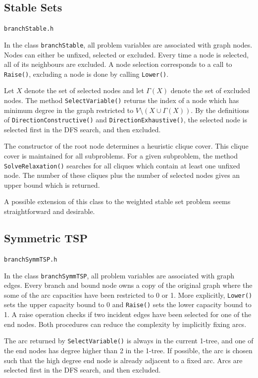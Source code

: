\documentclass[a4paper,11pt,twoside]{book}
\begin{document}
\begin{multicols}{2}
\subsection{Stable Sets}
\label{slb_bbstable}
\myinclude\verb/branchStable.h/

\noindent
In the class \verb/branchStable/, all problem variables are associated with
graph nodes. Nodes can either be unfixed, selected or excluded. Every time
a node is selected, all of its neighbours are excluded. A node selection
corresponds to a call to \verb/Raise()/, excluding a node is done by calling
\verb/Lower()/.

Let $X$ denote the set of selected nodes and let $\Gamma(X)$ denote the set of
excluded nodes. The method \verb/SelectVariable()/ returns the index of a node
which has minimum degree in the graph restricted to
$V\setminus(X\cup\Gamma(X))$. By the definitions of
\verb/DirectionConstructive()/ and \verb/DirectionExhaustive()/, the selected
node is selected first in the DFS search, and then excluded.

The constructor of the root node determines a heuristic clique cover. This
clique cover is maintained for all subproblems. For a given subproblem, the
method \verb/SolveRelaxation()/ searches for all cliques which contain at least
one unfixed node. The number of these cliques plus the number of selected nodes
gives an upper bound which is returned.

A possible extension of this class to the weighted stable set problem seems
straightforward and desirable.


\subsection{Symmetric TSP}
\label{slb_branchSymmTSP}
\myinclude\verb/branchSymmTSP.h/

\noindent
In the class \verb/branchSymmTSP/, all problem variables are associated with
graph edges. Every branch and bound node owns a copy of the original
graph where the some of the arc capacities have been restricted to 0 or 1.
More explicitly, \verb/Lower()/ sets the upper capacity bound to 0 and
\verb/Raise()/ sets the lower capacity bound to 1. A raise operation checks if
two incident edges have been selected for one of the end nodes. Both procedures
can reduce the complexity by implicitly fixing arcs.

The arc returned by \verb/SelectVariable()/ is always in the current 1-tree,
and one of the end nodes has degree higher than 2 in the 1-tree. If possible,
the arc is chosen such that the high degree end node is already adjacent to a
fixed arc. Arcs are selected first in the DFS search, and then excluded.


\end{multicols}
\end{document}
